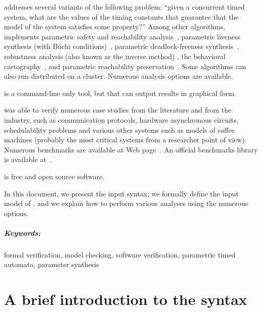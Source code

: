 \imitator{} addresses several variants of the following problem:
``given a concurrent timed system, what are the values of the timing constants that guarantee that the model of the system satisfies some property?''
Among other algorithms, \imitator{} implements
parametric safety and reachability analysis~\cite{AHV93,JLR15},
parametric liveness synthesis (with Büchi conditions)~\cite{NPP18,AAPP21},
parametric deadlock-freeness synthesis~\cite{Andre16},
robustness analysis (also known as the inverse method) \cite{ACEF09,ALM20},
the behavioral cartography~\cite{AF10},
and
parametric reachability preservation~\cite{ALNS15}.
Some algorithms can also run distributed on a cluster.
Numerous analysis options are available.

\imitator{} is a command-line only tool, but that can output results in graphical form.

\imitator{} was able to verify numerous case studies from the literature and from the industry, such as communication protocols, hardware asynchronous circuits, schedulability problems and various other systems such as models of coffee machines (probably the most critical systems from a researcher point of view).
Numerous benchmarks are available at \imitator{} Web page~\cite{imitator}.
An official benchmarks library is available at~\cite{AMP21}.

\imitator{} is free and open source software.

In this document, we present the input syntax, we formally define the input model of \imitator{}, and we explain how to perform various analyses using the numerous options.


\paragraph{Keywords:} formal verification, model checking, software verification, parametric timed automata, parameter synthesis



\chapter{A brief introduction to the syntax}\label{chapter:syntax-introduction}

